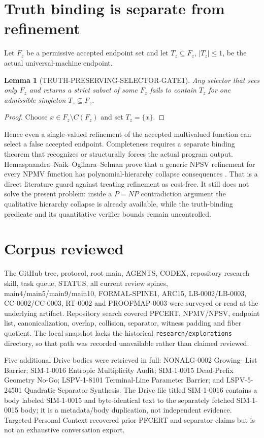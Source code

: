 \documentclass[11pt]{article}
\newtheorem{lemma}{Lemma}
\begin{document}
\section{Truth binding is separate from refinement}
Let $F_z$ be a permissive accepted endpoint set and let
$T_z\subseteq F_z$, $|T_z|\le1$, be the actual universal-machine endpoint.

\begin{lemma}[TRUTH-PRESERVING-SELECTOR-GATE1]
Any selector that sees only $F_z$ and returns a strict subset of some
$F_z$ fails to contain $T_z$ for one admissible singleton
$T_z\subseteq F_z$.
\end{lemma}
\begin{proof}
Choose $x\in F_z\setminus C(F_z)$ and set $T_z=\{x\}$.
\end{proof}

Hence even a single-valued refinement of the accepted multivalued function
can select a false accepted endpoint.  Completeness requires a separate
binding theorem that recognizes or structurally forces the actual program
output.  Hemaspaandra--Naik--Ogihara--Selman prove that a generic NPSV
refinement for every NPMV function has polynomial-hierarchy collapse
consequences \cite{hnos1996}.  That is a direct literature guard against
treating refinement as cost-free.  It still does not solve the present
problem: inside a $P=NP$ contradiction argument the qualitative hierarchy
collapse is already available, while the truth-binding predicate and its
quantitative verifier bounds remain uncontrolled.

\section{Corpus reviewed}
The GitHub tree, protocol, root main, AGENTS, CODEX, repository research
skill, task queue, STATUS, all current review spines, main4/main5/main9/main10,
FORMAL-SPINE1, ARC15, LB-0002/LB-0003, CC-0002/CC-0003, RT-0002 and
PROOFMAP-0003 were surveyed or read at the underlying artifact.  Repository
search covered PFCERT, NPMV/NPSV, endpoint list, canonicalization, overlap,
collision, separator, witness padding and fiber quotient.  The local
snapshot lacks the historical \texttt{research/explorations} directory, so
that path was recorded unavailable rather than claimed reviewed.

Five additional Drive bodies were retrieved in full: NONALG-0002 Growing-
List Barrier; SIM-1-0016 Entropic Multiplicity Audit; SIM-1-0015 Dead-Prefix
Geometry No-Go; LSPV-1-8101 Terminal-Line Parameter Barrier; and LSPV-5-24501
Quadratic Separator Synthesis.  The Drive file titled SIM-1-0016 contains a
body labeled SIM-1-0015 and byte-identical text to the separately fetched
SIM-1-0015 body; it is a metadata/body duplication, not independent evidence.
Targeted Personal Context recovered prior PFCERT and separator claims but is
not an exhaustive conversation export.
\end{document}
